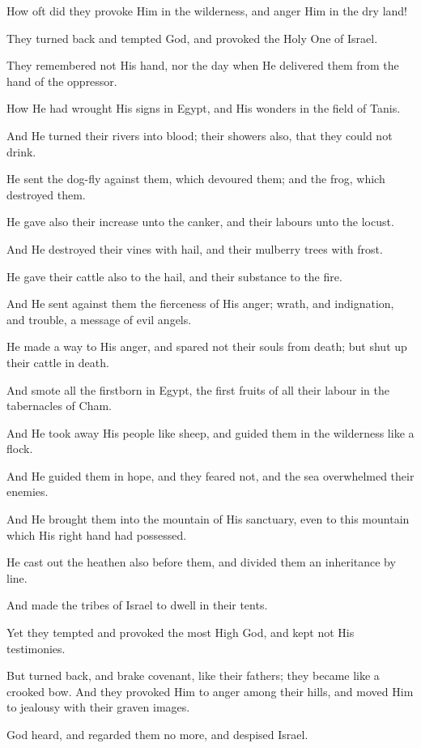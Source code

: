 How oft did they provoke Him in the wilderness, and anger Him in the dry land!

They turned back and tempted God, and provoked the Holy One of Israel.

They remembered not His hand, nor the day when He delivered them from the hand of the oppressor.

How He had wrought His signs in Egypt, and His wonders in the field of Tanis.

And He turned their rivers into blood; their showers also, that they could not drink.

He sent the dog-fly against them, which devoured them; and the frog, which destroyed them.

He gave also their increase unto the canker, and their labours unto the locust.

And He destroyed their vines with hail, and their mulberry trees with frost.

He gave their cattle also to the hail, and their substance to the fire.

And He sent against them the fierceness of His anger; wrath, and indignation, and trouble, a message of evil angels.

He made a way to His anger, and spared not their souls from death; but shut up their cattle in death.

And smote all the firstborn in Egypt, the first fruits of all their labour in the tabernacles of Cham.

And He took away His people like sheep, and guided them in the wilderness like a flock.

And He guided them in hope, and they feared not, and the sea overwhelmed their enemies.

And He brought them into the mountain of His sanctuary, even to this mountain which His right hand had possessed.

He cast out the heathen also before them, and divided them an inheritance by line.

And made the tribes of Israel to dwell in their tents.

Yet they tempted and provoked the most High God, and kept not His testimonies.

But turned back, and brake covenant, like their fathers; they became like a crooked bow.
And they provoked Him to anger among their hills, and moved Him to jealousy with their graven images.

God heard, and regarded them no more, and despised Israel.


